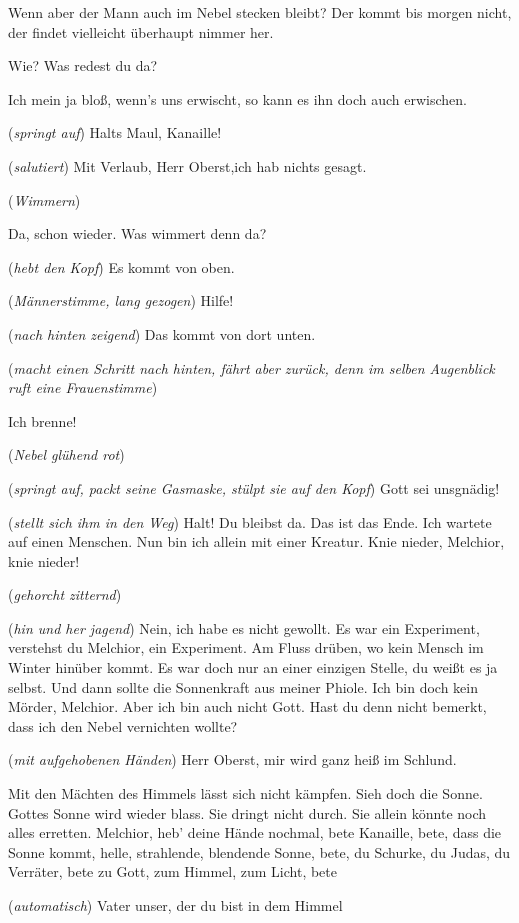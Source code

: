 \documentclass[
	final,
	a4paper,
	ngerman,
	mpinclude = true, %
	twoside = true,
	open = right,
	cleardoublepage = plain,
	DIV = 13,
	BCOR = 1cm,
	titlepage = firstiscover,
	]{scrbook}
\newcommand{\direction}[1]{(\textit{#1})}
\newcommand{\thecharacter}[1]{\textup{\textsc{#1}}\xspace}
\newcommand{\theBrix}{\thecharacter{Oberst~Brix}}
\newcommand{\theMelchior}{\thecharacter{Melchior}}
\newcommand{\character}[1]{\item[#1]}
\newcommand{\Brix}{\character{\theBrix}}
\newcommand{\Melchior}{\character{\theMelchior}}
\newcommand{\Stimme}{\character{\emph{Stimme}}}
\begin{document}
\begin{play}
\Melchior
Wenn aber der Mann auch im Nebel stecken bleibt? Der kommt bis morgen nicht, der findet vielleicht überhaupt nimmer her.

\Brix
Wie? Was redest du da?

\Melchior
Ich mein ja bloß, wenn's uns erwischt, so kann es ihn doch auch erwischen.

\Brix
\direction{springt auf} Halts Maul, Kanaille!

\Melchior
\direction{salutiert} Mit Verlaub, Herr Oberst,ich hab nichts gesagt.

\direction{Wimmern}

\Melchior
Da, schon wieder. Was wimmert denn da?

\Brix
\direction{hebt den Kopf} Es kommt von oben.

\Stimme
\direction{Männerstimme, lang gezogen} Hilfe!

\Melchior
\direction{nach hinten zeigend} Das kommt von dort unten.

\Brix
\direction{macht einen Schritt nach hinten, fährt aber zurück, denn im selben Augenblick ruft eine Frauenstimme}

\Stimme
Ich brenne!

\direction{Nebel glühend rot}

\Melchior
\direction{springt auf, packt seine Gasmaske, stülpt sie auf den Kopf} Gott sei unsgnädig!

\Brix
\direction{stellt sich ihm in den Weg} Halt! Du bleibst da. Das ist das Ende. Ich wartete auf einen Menschen. Nun bin ich allein mit einer Kreatur. Knie nieder, Melchior, knie nieder!

\Melchior
\direction{gehorcht zitternd}

\Brix
\direction{hin und her jagend} Nein, ich habe es nicht gewollt. Es war ein Experiment, verstehst du Melchior, ein Experiment. Am Fluss drüben, wo kein Mensch im Winter hinüber kommt. Es war doch nur an einer einzigen Stelle, du weißt es ja selbst. Und dann sollte die Sonnenkraft aus meiner Phiole. Ich bin doch kein Mörder, Melchior. Aber ich bin auch nicht Gott. Hast du denn nicht bemerkt, dass ich den Nebel vernichten wollte?

\Melchior
\direction{mit aufgehobenen Händen} Herr Oberst, mir wird ganz heiß im Schlund.

\Brix
Mit den Mächten des Himmels lässt sich nicht kämpfen. Sieh doch die Sonne. Gottes Sonne wird wieder blass. Sie dringt nicht durch. Sie allein könnte noch alles erretten. Melchior, heb' deine Hände nochmal, bete Kanaille, bete, dass die Sonne kommt, helle, strahlende, blendende Sonne, bete, du Schurke, du Judas, du Verräter, bete zu Gott, zum Himmel, zum Licht, bete

\Melchior
\direction{automatisch} Vater unser, der du bist in dem Himmel

\end{play}
\end{document}
